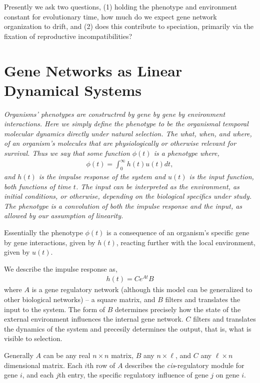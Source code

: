 \documentclass{article}
\newcommand{\jss}[1]{{\color{olive}\it #1}}
\newcommand{\1}{\mathbbm{1}}
\begin{document}
  Presently we ask two questions, (1) holding the phenotype and environment constant for evolutionary time, how much do we expect gene network organization to drift, and (2) does this contribute to speciation, primarily via the fixation of reproductive incompatibilities?

\section*{Gene Networks as Linear Dynamical Systems}

  \jss{Organisms' phenotypes are constructred by gene by gene by environment interactions. Here we simply define the phenotype to be the organismal temporal molecular dynamics directly under natural selection. The \emph{what}, \emph{when}, and \emph{where}, of an organism's molecules that are physiologically or otherwise relevant for survival. 
   Thus we say that some function $\phi(t)$ is a phenotype where, 
  \begin{align}
    \phi(t) = \int_{0}^{\infty} h(t) u(t) dt  ,
  \end{align}
  and $h(t)$ is the \emph{impulse response} of the system and $u(t)$ is the \emph{input} function, both functions of time $t$. The input can be interpreted as the environment, as initial conditions, or otherwise, depending on the biological specifics under study. The phenotype is a convolution of both the impulse response and the input, as allowed by our assumption of linearity. 

  Essentially the phenotype $\phi(t)$ is a consequence of an organism's specific gene by gene interactions, given by $h(t)$, reacting further with the local environment, given by $u(t)$. 

  We describe the impulse response as, 
  \begin{align}
    h(t) = C e^{A t} B
  \end{align}
  where $A$ is a gene regulatory network (although this model can be generalized to other biological networks) -- a square matrix, and $B$ filters and translates the input to the system. The form of $B$ determines precisely how the state of the external environment influences the internal gene network. $C$ filters and translates the dynamics of the system and precesily determines the output, that is, what is visible to selection. 

  Generally $A$ can be any real $n \times n$ matrix, $B$ any $n \times \ell$, and $C$ any $\ell \times n$ dimensional matrix. Each $i$th row of $A$ describes the \emph{cis}-regulatory module for gene $i$, and each $j$th entry, the specific regulatory influence of gene $j$ on gene $i$. 

}
\end{document}
